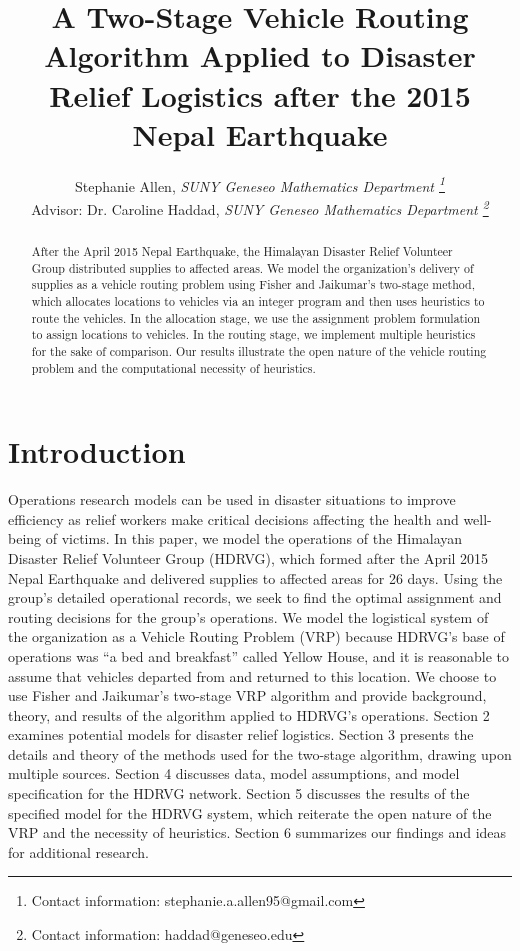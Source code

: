 \documentclass[11pt]{article}
\title{\vspace{-3em} A Two-Stage Vehicle Routing Algorithm Applied to Disaster Relief Logistics after the 2015 Nepal Earthquake}
\author{Stephanie Allen, \textit{SUNY Geneseo Mathematics Department \footnote{Contact information: stephanie.a.allen95@gmail.com}}\\
Advisor: Dr. Caroline Haddad, \textit{SUNY Geneseo Mathematics Department \footnote{Contact information: haddad@geneseo.edu}}}
\date{}
\begin{document}
\maketitle


\begin{abstract}
After the April 2015 Nepal Earthquake, the Himalayan Disaster Relief Volunteer Group distributed supplies to affected areas.  We model the organization’s delivery of supplies as a vehicle routing problem using Fisher and Jaikumar's two-stage method, which allocates locations to vehicles via an integer program and then uses heuristics to route the vehicles.  In the allocation stage, we use the assignment problem formulation to assign locations to vehicles.  In the routing stage, we implement multiple heuristics for the sake of comparison.  Our results illustrate the open nature of the vehicle routing problem and the computational necessity of heuristics.


  
\end{abstract}




\section{Introduction}


Operations research models can be used in disaster situations to improve efficiency as relief workers make critical decisions affecting the health and well-being of victims.  In this paper, we model the operations of the Himalayan Disaster Relief Volunteer Group (HDRVG), which formed after the April 2015 Nepal Earthquake and delivered supplies to affected areas for 26 days.  Using the group's detailed operational records, we seek to find the optimal assignment and routing decisions for the group's operations.  We model the logistical system of the organization as a Vehicle Routing Problem (VRP) because HDRVG's base of operations was ``a bed and breakfast'' called Yellow House, and it is reasonable to assume that vehicles departed from and returned to this location.  We choose to use Fisher and Jaikumar's two-stage VRP algorithm and provide background, theory, and results of the algorithm applied to HDRVG's operations. %
Section 2 examines potential models for disaster relief logistics.  Section 3 presents the details and theory of the methods used for the two-stage algorithm, drawing upon multiple sources. Section 4 discusses data, model assumptions, and model specification for the HDRVG network.  Section 5 discusses the results of the specified model for the HDRVG system, which reiterate the open nature of the VRP and the necessity of heuristics. Section 6 summarizes our findings and ideas for additional research.   
\end{document}
